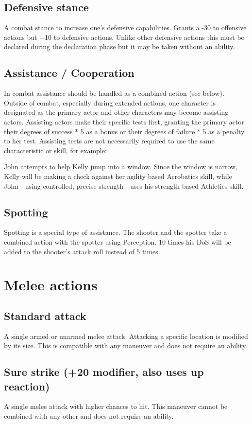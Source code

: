 \documentclass[12pt,a4paper]{book}
\newenvironment{exampleblock}[1][1]
{\hfill\begin{minipage}{\dimexpr\textwidth-#1cm}}
{\end{minipage}}
\begin{document}
	\subsection*{Defensive stance}
	A combat stance to increase one’s defensive capabilities. Grants a -30 to offensive actions but +10 to defensive actions. Unlike other defensive actions this must be declared during the declaration phase but it may be taken without an ability.
	\subsection*{Assistance / Cooperation}
	In combat assistance should be handled as a combined action (see below). Outside of combat, especially during extended actions, one character is designated as the primary actor and other characters may become assisting actors. Assisting actors make their specific tests first, granting the primary actor their degrees of success * 5 as a bonus or their degrees of failure * 5 as a penalty to her test. Assisting tests are not necessarily required to use the same characteristic or skill, for example:
	
	\begin{exampleblock}
		John attempts to help Kelly jump into a window. Since the window is narrow, Kelly will be making a check against her agility based Acrobatics skill, while John - using controlled, precise strength - uses his strength based Athletics skill.
	\end{exampleblock}
	\subsection*{Spotting}
	Spotting is a special type of assistance. The shooter and the spotter take a combined action with the spotter using Perception. 10 times his DoS will be added to the shooter’s attack roll instead of 5 times.
	\section{Melee actions}
	\subsection*{Standard attack}
	A single armed or unarmed melee attack. Attacking a specific location is modified by its size. This is compatible with any maneuver and does not require an ability. 
	\subsection*{Sure strike (+20 modifier, also uses up reaction)}
	A single melee attack with higher chances to hit. This maneuver cannot be combined with any other and does not require an ability.
\end{document}
